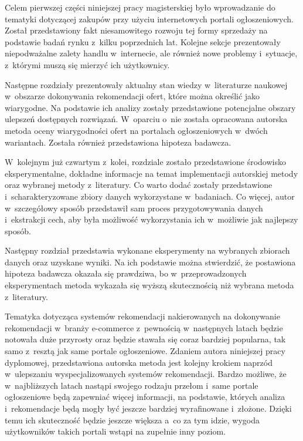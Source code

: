 \documentclass[../Kamil_Kowalewski_Main.tex]{subfiles}
\begin{document}
 {
    Celem pierwszej części niniejszej pracy magisterskiej było wprowadzanie do tematyki
    dotyczącej zakupów przy użyciu internetowych portali ogłoszeniowych. Został
    przedstawiony fakt niesamowitego rozwoju tej formy sprzedaży na podstawie badań
    rynku z~kilku poprzednich lat. Kolejne sekcje prezentowały niepodważalne zalety
    handlu w~internecie, ale również nowe problemy i~sytuacje, z~którymi muszą się
    mierzyć ich użytkownicy.

    Następne rozdziały prezentowały aktualny stan wiedzy w~literaturze naukowej
    w~obszarze dokonywania rekomendacji ofert, które można określić jako wiarygodne. Na
    podstawie ich analizy zostały przedstawione potencjalne obszary ulepszeń dostępnych
    rozwiązań. W~oparciu o~nie została opracowana autorska metoda oceny wiarygodności
    ofert na portalach ogłoszeniowych w~dwóch wariantach. Została również przedstawiona
    hipoteza badawcza.

    W~kolejnym już czwartym z~kolei, rozdziale zostało przedstawione środowisko
    eksperymentalne, dokładne informacje na temat implementacji autorskiej metody oraz
    wybranej metody z~literatury. Co warto dodać zostały przedstawione
    i~scharakteryzowane zbiory danych wykorzystane w~badaniach. Co więcej, autor
    w~szczegółowy sposób przedstawił sam proces przygotowywania danych i~ekstrakcji
    cech, aby była możliwość wykorzystania ich w~możliwie jak najlepszy sposób.

    Następny rozdział przedstawia wykonane eksperymenty na wybranych zbiorach danych
    oraz uzyskane wyniki. Na ich podstawie można stwierdzić, że postawiona hipoteza
    badawcza okazała się prawdziwa, bo w~przeprowadzonych eksperymentach metoda wykazała
    się wyższą skutecznością niż wybrana metoda z~literatury.

    Tematyka dotycząca systemów rekomendacji nakierowanych na dokonywanie rekomendacji
    w~branży e-commerce z~pewnością w~następnych latach będzie notowała duże przyrosty
    oraz będzie stawała się coraz bardziej popularna, tak samo z~resztą jak same
    portale ogłoszeniowe. Zdaniem autora niniejszej pracy dyplomowej, przedstawiona
    autorska metoda jest kolejny krokiem naprzód w~ulepszaniu wyspecjalizowanych
    systemów rekomendacji. Bardzo możliwe, że w~najbliższych latach nastąpi swojego
    rodzaju przełom i~same portale ogłoszeniowe będą zapewniać więcej informacji, na
    podstawie, których analiza i~rekomendacje będą mogły być jeszcze bardziej
    wyrafinowane i~złożone. Dzięki temu ich skuteczność będzie jeszcze większa a~co za
    tym idzie, wygoda użytkowników takich portali wstąpi na zupełnie inny poziom.
}
\end{document}
